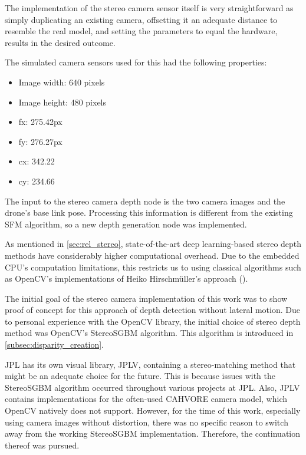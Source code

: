 The implementation of the stereo camera sensor itself is very straightforward as simply duplicating an existing camera, offsetting it an adequate distance to resemble the real model, and setting the parameters to equal the hardware, results in the desired outcome.

The simulated camera sensors used for this had the following properties:

\begin{itemize}
    \item Image width: 640 pixels
    \item Image height: 480 pixels
    \item fx: 275.42px
    \item fy: 276.27px
    \item cx: 342.22
    \item cy: 234.66
\end{itemize}

The input to the stereo camera depth node is the two camera images and the drone's base link pose. Processing this information is different from the existing SFM algorithm, so a new depth generation node was implemented. 

As mentioned in \cref{sec:rel_stereo}, state-of-the-art deep learning-based stereo depth methods have considerably higher computational overhead. Due to the embedded CPU's computation limitations, this restricts us to using classical algorithms such as OpenCV's implementations of Heiko Hirschmüller's approach (\citep{Stereo}).

The initial goal of the stereo camera implementation of this work was to show proof of concept for this approach of depth detection without lateral motion. Due to personal experience with the OpenCV library, the initial choice of stereo depth method was OpenCV's StereoSGBM algorithm. This algorithm is introduced in \cref{subsec:disparity_creation}.

JPL has its own visual library, JPLV, containing a stereo-matching method that might be an adequate choice for the future. This is because issues with the StereoSGBM algorithm occurred throughout various projects at JPL.%
Also, JPLV contains implementations for the often-used CAHVORE camera model, which OpenCV natively does not support. However, for the time of this work, especially using camera images without distortion, there was no specific reason to switch away from the working StereoSGBM implementation. Therefore, the continuation thereof was pursued.

